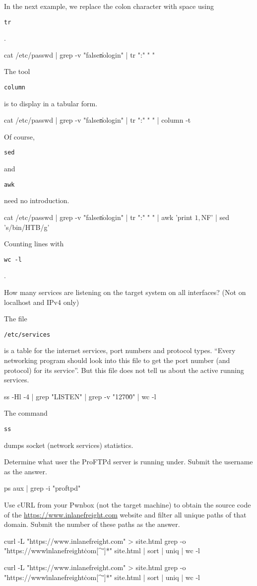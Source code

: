 \documentclass[a4paper,12pt]{article}
\newcommand{\bashinline}[1]{%
\colorbox{bashcodebg}{%
\parbox[b][0.6em]{\widthof{\texttt{#1}}}{\texttt{#1}}%
}%
}
\begin{document}
In the next example, we replace the colon character with space using \bashinline{tr}.
\begin{bash}
cat /etc/passwd | grep -v "false\|nologin" | tr ":" " "
\end{bash}

The tool \bashinline{column} is to display in a tabular form.
\begin{bash}
cat /etc/passwd | grep -v "false\|nologin" | tr ":" " " | column -t
\end{bash}

Of course, \bashinline{sed} and \bashinline{awk} need no introduction.
\begin{bash}
cat /etc/passwd | grep -v "false\|nologin" | tr ":" " " |
awk '{print $1, $NF}' | sed 's/bin/HTB/g'
\end{bash}

Counting lines with \bashinline{wc -l}.

\n

How many services are listening on the target system on all interfaces? (Not on localhost and IPv4 only)

The file \bashinline{/etc/services} is a table for the internet services, port numbers and protocol types. ``Every networking program should look into this file to get the port number (and protocol) for its service''. But this file does not tell us about the active running services.
\begin{bash}
ss -Hl -4 | grep "LISTEN" | grep -v "127\.0\.0" | wc -l
\end{bash}

The command \bashinline{ss} dumps socket (network services) statistics.

\n

Determine what user the ProFTPd server is running under. Submit the username as the answer.
\begin{bash}
ps aux | grep -i "proftpd"
\end{bash}

\n

Use cURL from your Pwnbox (not the target machine) to obtain the source code of the \url{https://www.inlanefreight.com} website and filter all unique paths of that domain. Submit the number of these paths as the answer.
\begin{bash}
curl -L "https://www.inlanefreight.com" > site.html
grep -o "https\?://www\.inlanefreight\.com[^\"']*" site.html |
sort | uniq | wc -l
\end{bash}

\begin{bash}
curl -L "https://www.inlanefreight.com" > site.html
grep -o "https\?://www\.inlanefreight\.com[^\"']*" site.html |
sort | uniq | wc -l
\end{bash}
\end{document}
